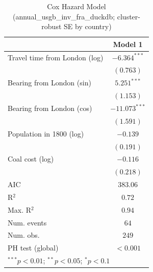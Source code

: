 
\begin{table}
\begin{center}
\begin{tabular}{l c}
\hline
 & Model 1 \\
\hline
Travel time from London (log) & $-6.364^{***}$ \\
 & $(0.763)$ \\
Bearing from London (sin) & $5.251^{***}$ \\
 & $(1.153)$ \\
Bearing from London (cos) & $-11.073^{***}$ \\
 & $(1.591)$ \\
Population in 1800 (log) & $-0.139$ \\
 & $(0.191)$ \\
Coal cost (log) & $-0.116$ \\
 & $(0.218)$ \\
\hline
AIC              & $383.06$ \\
R$^2$            & $0.72$ \\
Max. R$^2$       & $0.94$ \\
Num. events      & $64$ \\
Num. obs.        & $249$ \\
PH test (global) & $<0.001$ \\
\hline
\multicolumn{2}{l}{\scriptsize{$^{***}p<0.01$; $^{**}p<0.05$; $^{*}p<0.1$}}
\end{tabular}
\caption{Cox Hazard Model (annual\_usgb\_inv\_fra\_duckdb; cluster-robust SE by country)}
\label{tab:cox_serious_annual_usgb_inv_fra_duckdb}
\end{center}
\end{table}
